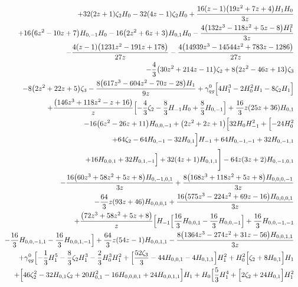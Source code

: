\begin{eqnarray}
\nonumber \\ &&
+32 (2 z+1) \zeta_2 H_0-32  (4 z-1) \zeta_2 H_0+\frac{16 (z-1) \big(19 z^2+7 z+4\big) H_1 H_0}{3 z}
\nonumber \\ &&
+16  \big(6z^2-10 z+7\big) H_{0,-1} H_0-16 \big(2 z^2+6 z+3\big) H_{0,1} H_0-\frac{4  \big(132 z^3-118 z^2+5 z-8\big) H_1^2}{3 z}
\nonumber \\ &&
-\frac{4  (z-1) \big(1231  z^2-191 z+178\big)}{27 z}-\frac{4 \big(14939 z^3-14544 z^2+783  z-1286\big)}{27 z}
\nonumber \\ &&
-\frac{4}{3} \big(30 z^2+214 z-11\big) \zeta_2+8 \big(2 z^2-46 z+13\big) \zeta_3
\nonumber \\ &&
-8 \big(2 z^2+22 z+5\big)\zeta_3-\frac{8 \big(617 z^3-604 z^2-70 z-28\big) H_1}{9  z}+{\gamma}_{qg}^{0} \Bigl[4 H_1^3-2 H_0^2 H_1-8 \zeta_2H_1\Bigr]
\nonumber \\ &&
+\frac{\big(146 z^3+118 z^2-z+16\big) }{z}\Bigl[-\frac{4}{3}   \zeta_2-\frac{8}{3}  H_{-1} H_0+\frac{8}{3}   H_{0,-1}\Bigr]
+\frac{16}{3} z (25 z+36) H_{0,1}
\nonumber \\ &&
-16  \big(6 z^2-26z+11\big) H_{0,0,-1}+\big(2 z^2+2 z+1\big) \Bigl[32  H_0H_{-1}^2+\Bigl[-24  H_0^2
\nonumber \\ &&
+64  \zeta_2-64  H_{0,-1}-32 H_{0,1}\Bigr] H_{-1}+64  H_{0,-1,-1}+32  H_{0,-1,1}
\nonumber \\ &&
+16H_{0,0,1}+32  H_{0,1,-1}\Bigr]+32 (4 z+1) H_{0,1,1}\Biggr]
-64  z (3z+2) H_{0,-1,0,1}
\nonumber \\ &&
-\frac{16 \big(60 z^3+58 z^2+5 z+8\big) H_{0,-1,0,1}}{3  z}+\frac{8 \big(168 z^3+118 z^2+5 z+8\big) H_{0,0,0,-1}}{3 z}
\nonumber \\ &&
-\frac{64}{3} z (93 z+46) H_{0,0,0,1}+\frac{16 \big(575 z^3-224 z^2+69 z-16\big)  H_{0,0,0,1}}{3 z}
\nonumber \\ &&
+\frac{\big(72 z^3+58 z^2+5 z+8\big) }{z}\Bigl[H_{-1}  
\Bigl[\frac{16}{3} H_{0,0,1}-\frac{16}{3} H_{0,0,-1}\Bigr]+\frac{16}{3}  H_{0,0,-1,-1}
\nonumber \\ &&
-\frac{16}{3} H_{0,0,-1,1}-\frac{16}{3}  H_{0,0,1,-1}\Bigr]
+\frac{64}{3}  z (54 z-1) H_{0,0,1,1}-\frac{8  \big(1364 z^3-274 z^2+31 z-56\big) H_{0,0,1,1}}{3 z}
\nonumber \\ &&
+{\gamma}_{qg}^{0}\Bigl[-\frac{1}{3} H_1^5-\frac{8}{3} \zeta_2 H_1^3-\frac{2}{3} H_0^3H_1^2+\Bigl[\frac{52 \zeta_3}{3}-44 H_{0,0,1}-4 H_{0,1,1}\Bigr] H_1^2+H_0^2\Bigl[\zeta_2+8 H_{0,1}\Bigr] H_1
\nonumber \\ &&
+\Bigl[46 \zeta_2^2-32 H_{0,1}\zeta_2+20 H_{0,1}^2-16 H_{0,0,0,1}+24 H_{0,0,1,1}\Bigr] H_1+H_0\Bigl[\frac{5}{3} H_1^4+\Bigl[2 \zeta_2+24 H_{0,1}\Bigr] H_1^2

\end{eqnarray}
